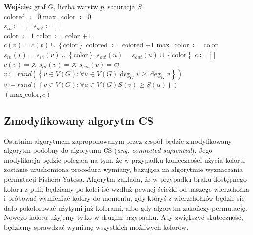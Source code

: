 \documentclass[10pt,a4paper]{article}
\begin{document}
	\begin{algorithmic}
		\State \textbf{Wejście:} graf $G$, liczba warstw $p$, saturacja $S$
		\\
		\State colored $\coloneqq 0$
		\State max\_color $\coloneqq 0$ 
		\\
		\State $s_{in} \coloneqq \left[\right]$
		\State $s_{out} \coloneqq \left[\right]$
		\\
			\State color $\coloneqq 1$
				\State color $\coloneqq$ color $+ 1$
			\EndWhile
			\\
			\State $c(v) = c(v) \cup \left\{\text{color}\right\}$
			\State colored $\coloneqq$ colored $ + 1$
				\State max\_color $\coloneqq$ color
			\EndIf
			\\
			\State $s_{in}(v) = s_{in}(v) \cup \left\{\text{color}\right\}$
				\State $s_{out}(u) = s_{out}(u) \cup \left\{\text{color}\right\}$
			\EndFor
		\EndProcedure
		\newline
			\State $c \coloneqq \left[\right]$
			\\
				\State $c(v) = \varnothing$
				\State $s_{in}(v) = \varnothing$
				\State $s_{out}(v) = \varnothing$
			\EndFor
			\\
			\State $v \coloneqq rand(\left\{v \in V(G): \forall u \in V(G) \deg_{G} v \geq \deg_{G} u \right\})$
			\State {}
			\\
				\State $v \coloneqq rand(\left\{v \in V(G): \forall u \in V(G) S(v) \geq S(u) \right\})$
				\State {}
			\EndWhile
			\\
			\State \Return $(\text{max\_color}, c)$
		\EndFunction
	\end{algorithmic}

	\subsection{Zmodyfikowany algorytm CS}
	
	Ostatnim algorytmem zaproponowanym przez zespół będzie zmodyfikowany algorytm podobny do algorytmu CS (\textit{ang. connected sequential}). Jego modyfikacja będzie polegała na tym, że w przypadku konieczności użycia koloru, zostanie uruchomiona procedura wymiany, bazująca na algorytmie wyznaczania permutacji Fishera-Yatesa. Algorytm zakłada, że w przypadku braku dostępnego koloru z puli, będziemy po kolei iść wzdłuż pewnej ścieżki od naszego wierzchołka i próbować wymieniać kolory do momentu, gdy któryś z wierzchołków będzie się dało pokolorować użytymi już kolorami, albo gdy algorytm zakończy permutację. Nowego koloru użyjemy tylko w drugim przypadku. Aby zwiększyć skuteczność, będziemy sprawdzać wymianę wszystkich możliwych kolorów.
	
\end{document}
